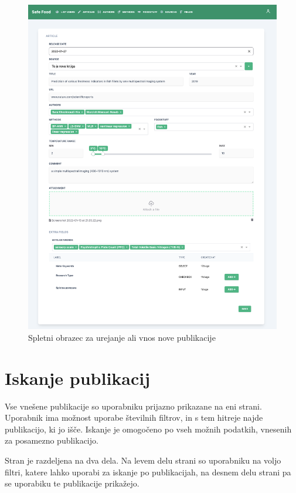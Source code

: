 \documentclass[a4paper, 12pt]{book}
\begin{document}
\begin{figure}[h]
\begin{center}
\includegraphics[width=1\textwidth]{slike/form-create-article.png}
\end{center}
\caption{ Spletni obrazec za urejanje ali vnos nove publikacije }
\label{edit-articles}
\end{figure}

\clearpage
\section{Iskanje publikacij}
\label{filters-page}
Vse vnešene publikacije so uporabniku prijazno prikazane na eni strani. Uporabnik ima možnost uporabe številnih filtrov, in s tem hitreje najde publikacijo, ki jo išče. Iskanje je omogočeno po vseh možnih podatkih, vnesenih za posamezno publikacijo. 

Stran je razdeljena na dva dela. Na levem delu strani so uporabniku na voljo filtri, katere lahko uporabi za iskanje po publikacijah, na desnem delu strani pa se uporabiku te publikacije prikažejo. 
\end{document}
